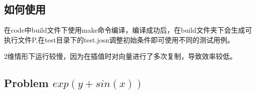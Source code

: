 \documentclass[UTF8]{ctexart}
\begin{document}
\pagestyle{fancy}
\fancyhead{}
\rhead{\today}



\subsection*{如何使用}
在code中build文件下使用make命令编译，编译成功后，在build文件夹下会生成可执行文件P,在test目录下的test.josn调整初始条件即可使用不同的测试用例。

2维情形下运行较慢，因为在插值时对向量进行了多次复制，导致效率较低。

\subsection*{Problem $exp(y+sin(x))$}
\end{document}
